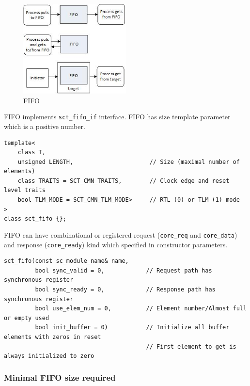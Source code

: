 \begin{figure}[!htb]
\centering
\includegraphics[width=0.5\textwidth]{pics/ss_fifo.jpg}
\caption{FIFO}
\label{fig:ss_fifo}
\end{figure}

FIFO implements {\tt sct\_fifo\_if} interface. FIFO has size template parameter which is a positive number.
\begin{lstlisting}[style=mycpp]
template<
    class T, 
    unsigned LENGTH,                      // Size (maximal number of elements)
    class TRAITS = SCT_CMN_TRAITS,        // Clock edge and reset level traits
    bool TLM_MODE = SCT_CMN_TLM_MODE>     // RTL (0) or TLM (1) mode
>
class sct_fifo {};
\end{lstlisting}

FIFO can have combinational or registered request ({\tt core\_req} and {\tt core\_data}) and response ({\tt core\_ready}) kind which specified in constructor parameters.
\begin{lstlisting}[style=mycpp]
sct_fifo(const sc_module_name& name, 
         bool sync_valid = 0,            // Request path has synchronous register 
         bool sync_ready = 0,            // Response path has synchronous register  
         bool use_elem_num = 0,          // Element number/Almost full or empty used 
         bool init_buffer = 0)           // Initialize all buffer elements with zeros in reset
                                         // First element to get is always initialized to zero 
\end{lstlisting}

\subsubsection{Minimal FIFO size required}

